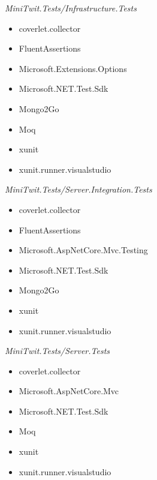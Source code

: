 \textit{MiniTwit.Tests/Infrastructure.Tests}
\begin{itemize}
   \item coverlet.collector 
   \item FluentAssertions  
   \item Microsoft.Extensions.Options   
   \item Microsoft.NET.Test.Sdk  
   \item Mongo2Go   
   \item Moq    
   \item xunit     
   \item xunit.runner.visualstudio  
\end{itemize}

\textit{MiniTwit.Tests/Server.Integration.Tests}
\begin{itemize}
   \item coverlet.collector 
   \item FluentAssertions  
   \item Microsoft.AspNetCore.Mvc.Testing    
   \item Microsoft.NET.Test.Sdk  
   \item Mongo2Go   
   \item xunit     
   \item xunit.runner.visualstudio  
\end{itemize}

\textit{MiniTwit.Tests/Server.Tests} 
\begin{itemize}
   \item coverlet.collector 
   \item Microsoft.AspNetCore.Mvc    
   \item Microsoft.NET.Test.Sdk  
   \item Moq   
   \item xunit     
   \item xunit.runner.visualstudio  
\end{itemize}











